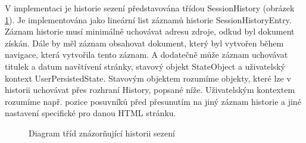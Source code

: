 V implementaci je historie sezení představována třídou SessionHistory (obrázek \ref{Figure.SessionHistoryDiagram}). Je implementována jako lineární list záznamů historie SessionHistoryEntry. Záznam historie musí minimálně uchovávat adresu zdroje, odkud byl dokument získán. Dále by měl záznam obsahovat dokument, který byl vytvořen během navigace, která vytvořila tento záznam. A dodatečně může záznam uchovávat titulek a datum navštívení stránky, stavový objekt StateObject a uživatelský kontext UserPersistedState. Stavovým objektem rozumíme objekty, které lze v historii uchovávat přes rozhraní History, popsané níže. Uživatelským kontextem rozumíme např. pozice posuvníků před přesunutím na jiný záznam historie a jiné nastavení specifické pro danou HTML stránku. 

\begin{figure}[H]
  \begin{center}
    \caption{Diagram tříd znázorňující historii sezení}
    \label{Figure.SessionHistoryDiagram}
  \end{center}
\end{figure}

